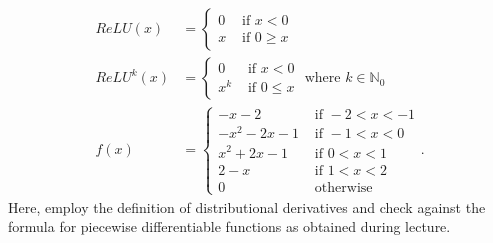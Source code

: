 \documentclass[11pt]{article}
\begin{document}




\begin{exercise}
    \begin{align*}
        ReLU(x) 
        &= \begin{cases} 0 & \text{ if } x < 0 \\ x & \text{ if } 0 \geq x \end{cases}
        \\
        ReLU^{k}(x) 
        &= \begin{cases} 0 & \text{ if } x < 0 \\ x^{k} & \text{ if } 0 \leq x \end{cases} \text{ where } k \in \mathbb N_0
        \\
        f(x) 
        &= 
        \begin{cases} 
            -x-2            & \text{ if } -2 < x < -1
            \\
            - x^{2} - 2x - 1 & \text{ if } -1 < x < 0 
            \\ 
              x^{2} + 2x - 1 & \text{ if } 0 <  x < 1
            \\
            2-x            & \text{ if }  1 < x < 2
            \\
            0              & \text{ otherwise }  
        \end{cases}
        .
    \end{align*}
    Here, employ the definition of distributional derivatives and check against the formula for piecewise differentiable functions as obtained during lecture. 
\end{exercise}
\end{document}
